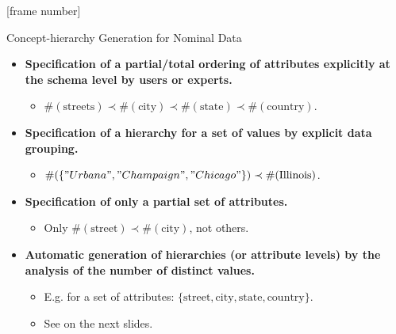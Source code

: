 \documentclass[aspectratio=169,t]{beamer}
\begin{document}
  {
    [frame number]
    \begin{frame}{Concept-hierarchy Generation for Nominal Data}
        \begin{itemize}
            \item \textbf{Specification of a partial/total ordering of attributes explicitly at the schema level by users or experts.}
            \begin{itemize}
              \item $\#(\text{streets}) \prec \#(\text{city}) \prec \#(\text{state}) \prec \#(\text{country})$.
            \end{itemize}
            \item \textbf{Specification of a hierarchy for a set of values by explicit data grouping.}
            \begin{itemize}
              \item $\#(\{"Urbana", "Champaign", "Chicago"\}) \prec \#(\text{Illinois})$.
            \end{itemize}
            \item \textbf{Specification of only a partial set of attributes.}
            \begin{itemize}
              \item Only $\#(\text{street}) \prec \#(\text{city})$, not others.
            \end{itemize}
            \item \textbf{Automatic generation of hierarchies (or attribute levels) by the analysis of the number of distinct values.}
            \begin{itemize}
              \item E.g. for a set of attributes: $\{\text{street}, \text{city}, \text{state}, \text{country}\}$.
              \item See on the next slides.
            \end{itemize}
        \end{itemize}
    \end{frame}
  }
\end{document}
